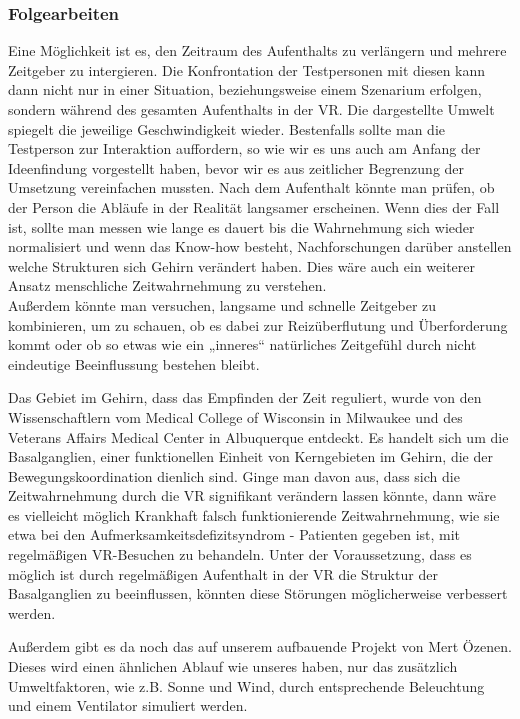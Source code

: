 \documentclass{Bericht}
\begin{document}
\subsubsection{Folgearbeiten}
Eine Möglichkeit ist es, den Zeitraum des Aufenthalts zu verlängern und mehrere Zeitgeber zu intergieren. Die Konfrontation der Testpersonen mit diesen kann dann nicht nur in einer Situation, beziehungsweise einem Szenarium erfolgen, sondern während des gesamten Aufenthalts in der VR. Die dargestellte Umwelt spiegelt die jeweilige Geschwindigkeit wieder. Bestenfalls sollte man die Testperson zur Interaktion auffordern, so wie wir es uns auch am Anfang der Ideenfindung vorgestellt haben, bevor wir es aus zeitlicher Begrenzung der Umsetzung vereinfachen mussten. Nach dem Aufenthalt könnte man prüfen, ob der Person die Abläufe in der Realität langsamer erscheinen. Wenn dies der Fall ist, sollte man messen wie lange es dauert bis die Wahrnehmung sich wieder normalisiert und wenn das Know-how besteht, Nachforschungen darüber anstellen welche Strukturen sich Gehirn verändert haben. Dies wäre auch ein weiterer Ansatz menschliche Zeitwahrnehmung zu verstehen.
\\
Außerdem könnte man versuchen, langsame und schnelle Zeitgeber zu  kombinieren, um zu schauen, ob es dabei zur Reizüberflutung und Überforderung kommt oder ob so etwas wie ein „inneres“ natürliches Zeitgefühl durch nicht eindeutige Beeinflussung bestehen bleibt.
\par
Das Gebiet im Gehirn, dass das Empfinden der Zeit reguliert, wurde von den Wissenschaftlern vom Medical College of Wisconsin in Milwaukee und des Veterans Affairs Medical Center in Albuquerque entdeckt. Es handelt sich um die Basalganglien, einer funktionellen Einheit von Kerngebieten im Gehirn, die der Bewegungskoordination dienlich sind. Ginge man davon aus, dass sich die Zeitwahrnehmung durch die VR signifikant verändern lassen könnte, dann wäre es vielleicht möglich Krankhaft falsch funktionierende Zeitwahrnehmung, wie sie etwa bei den Aufmerksamkeitsdefizitsyndrom - Patienten gegeben ist, mit regelmäßigen VR-Besuchen zu behandeln. Unter der Voraussetzung, dass es  möglich ist durch regelmäßigen Aufenthalt in der VR die Struktur der Basalganglien zu beeinflussen, könnten diese Störungen möglicherweise verbessert werden.
\par
Außerdem gibt es da noch das auf unserem aufbauende Projekt von Mert Özenen. Dieses wird einen ähnlichen Ablauf wie unseres haben, nur das zusätzlich Umweltfaktoren, wie z.B. Sonne und Wind, durch entsprechende Beleuchtung und einem Ventilator simuliert werden.
\end{document}
